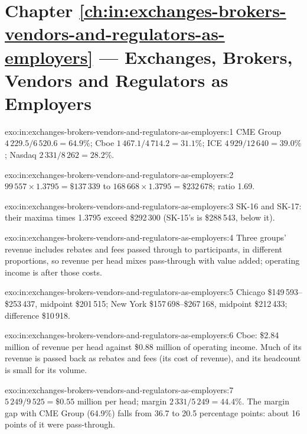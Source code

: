 \section*{Chapter \ref{ch:in:exchanges-brokers-vendors-and-regulators-as-employers} --- Exchanges, Brokers, Vendors and Regulators as Employers}

\begin{solution}{exo:in:exchanges-brokers-vendors-and-regulators-as-employers:1}
CME Group $4\,229.5/6\,520.6=64.9\%$; Cboe $1\,467.1/4\,714.2=31.1\%$; ICE $4\,929/12\,640=39.0\%$; Nasdaq
$2\,331/8\,262=28.2\%$.
\end{solution}

\begin{solution}{exo:in:exchanges-brokers-vendors-and-regulators-as-employers:2}
$99\,557\times1.3795=\$137\,339$ to $168\,668\times1.3795=\$232\,678$; ratio 1.69.
\end{solution}

\begin{solution}{exo:in:exchanges-brokers-vendors-and-regulators-as-employers:3}
SK-16 and SK-17: their maxima times 1.3795 exceed \$292\,300 (SK-15's is \$288\,543, below it).
\end{solution}

\begin{solution}{exo:in:exchanges-brokers-vendors-and-regulators-as-employers:4}
Three groups' revenue includes rebates and fees passed through to participants, in different proportions, so revenue
per head mixes pass-through with value added; operating income is after those costs.
\end{solution}

\begin{solution}{exo:in:exchanges-brokers-vendors-and-regulators-as-employers:5}
Chicago \$149\,593--\$253\,437, midpoint \$201\,515; New York \$157\,698--\$267\,168, midpoint \$212\,433; difference
\$10\,918.
\end{solution}

\begin{solution}{exo:in:exchanges-brokers-vendors-and-regulators-as-employers:6}
Cboe: \$2.84 million of revenue per head against \$0.88 million of operating income. Much of its revenue is passed back
as rebates and fees (its cost of revenue), and its headcount is small for its volume.
\end{solution}

\begin{solution}{exo:in:exchanges-brokers-vendors-and-regulators-as-employers:7}
$5\,249/9\,525=\$0.55$ million per head; margin $2\,331/5\,249=44.4\%$. The margin gap with CME Group (64.9\%) falls from
36.7 to 20.5 percentage points: about 16 points of it were pass-through.
\end{solution}

